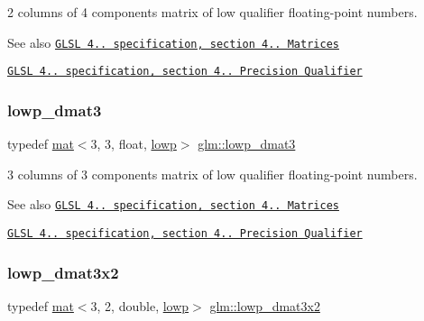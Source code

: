 2 columns of 4 components matrix of low qualifier floating-\/point numbers.

\begin{DoxySeeAlso}{See also}
\href{http://www.opengl.org/registry/doc/GLSLangSpec.4.20.8.pdf}{\tt G\+L\+SL 4.. specification, section 4.. Matrices} 

\href{http://www.opengl.org/registry/doc/GLSLangSpec.4.20.8.pdf}{\tt G\+L\+SL 4.. specification, section 4.. Precision Qualifier} 
\end{DoxySeeAlso}
\mbox{\label{group__core__precision_ga2e700c380867b8d935f2c9ea40c9ca16}} 
\subsubsection{\texorpdfstring{lowp\+\_\+dmat3}{lowp\_dmat3}}
{\footnotesize\ttfamily typedef \hyperlink{structglm_1_1mat}{mat}$<$3, 3, float, \hyperlink{namespaceglm_a36ed105b07c7746804d7fdc7cc90ff25ae161af3fc695e696ce3bf69f7332bc2d}{lowp}$>$ \hyperlink{group__core__precision_ga2e700c380867b8d935f2c9ea40c9ca16}{glm\+::lowp\+\_\+dmat3}}

3 columns of 3 components matrix of low qualifier floating-\/point numbers.

\begin{DoxySeeAlso}{See also}
\href{http://www.opengl.org/registry/doc/GLSLangSpec.4.20.8.pdf}{\tt G\+L\+SL 4.. specification, section 4.. Matrices} 

\href{http://www.opengl.org/registry/doc/GLSLangSpec.4.20.8.pdf}{\tt G\+L\+SL 4.. specification, section 4.. Precision Qualifier} 
\end{DoxySeeAlso}
\mbox{\label{group__core__precision_gae774d40dc418c39f5ef4dcf4deac0e3c}} 
\subsubsection{\texorpdfstring{lowp\+\_\+dmat3x2}{lowp\_dmat3x2}}
{\footnotesize\ttfamily typedef \hyperlink{structglm_1_1mat}{mat}$<$3, 2, double, \hyperlink{namespaceglm_a36ed105b07c7746804d7fdc7cc90ff25ae161af3fc695e696ce3bf69f7332bc2d}{lowp}$>$ \hyperlink{group__core__precision_gae774d40dc418c39f5ef4dcf4deac0e3c}{glm\+::lowp\+\_\+dmat3x2}}

